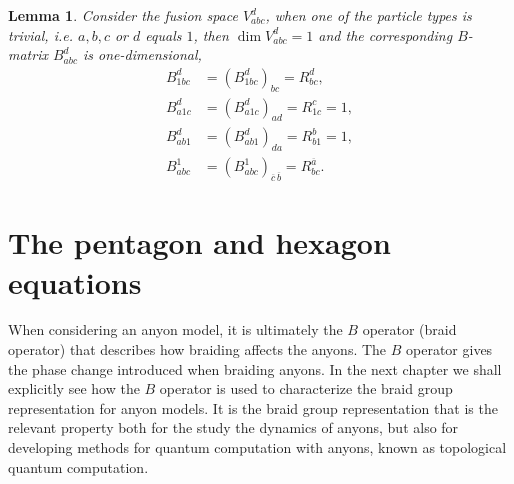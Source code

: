 \documentclass[a4paper,10pt,oneside]{book}
\theoremstyle{plain}
\newtheorem{lemma}[theorem]{Lemma}
\theoremstyle{definition}
\theoremstyle{remark}
\begin{document}
\begin{lemma}\label{res:B1}
  Consider the fusion space $V_{abc}^d$, when one of the particle types is trivial, i.e. $a,b,c$ or $d$ equals $1$, then $\dim V_{abc}^d = 1$ and the corresponding $B$-matrix $B_{abc}^d$ is one-dimensional,
  \begin{equation}
    \begin{aligned}
      B_{1bc}^d &= \left( B_{1bc}^d \right)_{bc} = R_{bc}^d, \\
      B_{a1c}^d &= \left( B_{a1c}^d \right)_{ad} = R_{1c}^c = 1, \\
      B_{ab1}^d &= \left( B_{ab1}^d \right)_{da} = R_{b1}^b = 1, \\
      B_{abc}^1 &= \left( B_{abc}^1 \right)_{\overline{c}\,\overline{b}} = R_{bc}^{\overline{a}}.
    \end{aligned}
  \end{equation}
\end{lemma}















































\section{The pentagon and hexagon equations}\label{sec:pentagon hexagon}

When considering an anyon model, it is ultimately the $B$ operator (braid operator) that describes how braiding affects the anyons. The $B$ operator gives the phase change introduced when braiding anyons. In the next chapter we shall explicitly see how the $B$ operator is used to characterize the braid group representation for anyon models. It is the braid group representation that is the relevant property both for the study the dynamics of anyons, but also for developing methods for quantum computation with anyons, known as topological quantum computation.
\end{document}
